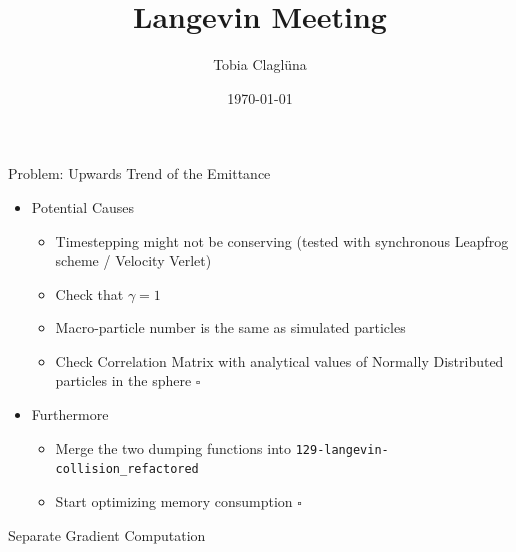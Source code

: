 
\title[\today]{Langevin Meeting}

\author{Tobia Claglüna}
\date{\today}
\def \myEmail {tobia.clagluena@psi.ch}





\begin{frame}{Problem: Upwards Trend of the Emittance}
        \begin{itemize}
            \item Potential Causes
                \begin{itemize}
                    \item Timestepping might not be conserving (tested with synchronous Leapfrog scheme / Velocity Verlet) \done
                    \item Check that $\gamma = 1$ \done
                    \item Macro-particle number is the same as simulated particles \done
                    \item Check Correlation Matrix with analytical values of Normally Distributed particles in the sphere $\square$
                \end{itemize}

            \item Furthermore
                \begin{itemize}
                    \item Merge the two dumping functions into \texttt{129-langevin-collision\_refactored} \done
                    \item Start optimizing memory consumption $\square$
                \end{itemize}
        \end{itemize}
\end{frame}

\begin{frame}[fragile]{Separate Gradient Computation}
    \inputminted{c++}{./code_snippets/solver.cpp}
\end{frame}

